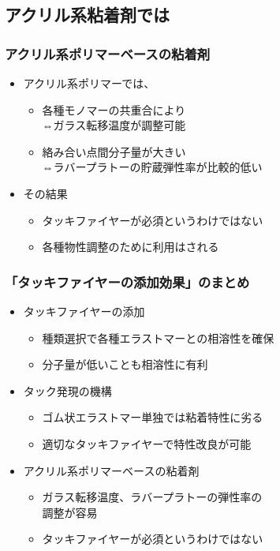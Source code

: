 \documentclass[unicode,12pt]{beamer}%
\begin{document}
\subsection{アクリル系粘着剤では}
\begin{frame}
	\frametitle{アクリル系ポリマーベースの粘着剤}

	\begin{itemize}
		\item アクリル系ポリマーでは、
		\begin{itemize}
			\item 各種モノマーの共重合により\\
			⇔ガラス転移温度が調整可能
			\item 絡み合い点間分子量が大きい\\
			⇔ラバープラトーの貯蔵弾性率が比較的低い
		\end{itemize}
		\item その結果
		\begin{itemize}
			\item タッキファイヤーが必須というわけではない
			\item 各種物性調整のために利用はされる
		\end{itemize}
	\end{itemize}
\end{frame}

\begin{frame}
	\frametitle{「タッキファイヤーの添加効果」のまとめ}
        \begin{boxnote}
            \vspace{-3mm}
            \begin{itemize}
                \item タッキファイヤーの添加
                    \begin{itemize}
                        \item 種類選択で各種エラストマーとの相溶性を確保
                        \item 分子量が低いことも相溶性に有利
                    \end{itemize} 
                \item タック発現の機構
                    \begin{itemize}
                        \item ゴム状エラストマー単独では粘着特性に劣る
                        \item 適切なタッキファイヤーで特性改良が可能
                    \end{itemize} 
                \item アクリル系ポリマーベースの粘着剤
                    \begin{itemize}
                        \item ガラス転移温度、ラバープラトーの弾性率の\\調整が容易
                        \item タッキファイヤーが必須というわけではない
                    \end{itemize}
            \end{itemize}
        \end{boxnote}
\end{frame}
\end{document}
